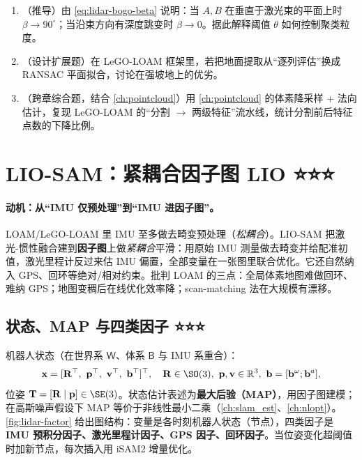 \begin{practice}
\begin{enumerate}
  \item （推导）由 \cref{eq:lidar-bogo-beta} 说明：当 $A,B$ 在垂直于激光束的平面上时 $\beta\to 90^\circ$；当沿束方向有深度跳变时 $\beta\to 0$。据此解释阈值 $\theta$ 如何控制聚类粒度。
  \item （设计扩展题）在 LeGO-LOAM 框架里，若把地面提取从“逐列评估”换成 RANSAC 平面拟合，讨论在强坡地上的优劣。
  \item （跨章综合题，结合 \cref{ch:pointcloud}）用 \cref{ch:pointcloud} 的体素降采样 + 法向估计，复现 LeGO-LOAM 的“分割 $\to$ 两级特征”流水线，统计分割前后特征点数的下降比例。
\end{enumerate}
\end{practice}

\section{LIO-SAM：紧耦合因子图 LIO ⭐⭐⭐}
\label{sec:lidar-liosam}

\paragraph{动机：从“IMU 仅预处理”到“IMU 进因子图”。}
LOAM/LeGO-LOAM 里 IMU 至多做去畸变预处理（\emph{松耦合}）。LIO-SAM\cite{shan2020liosam} 把激光-惯性融合建到\textbf{因子图}上做\emph{紧耦合}平滑：用原始 IMU 测量做去畸变并给配准初值，激光里程计反过来估 IMU 偏置，全部变量在一张图里联合优化。它还自然纳入 GPS、回环等绝对/相对约束。批判 LOAM 的三点：全局体素地图难做回环、难纳 GPS；地图变稠后在线优化效率降；scan-matching 法在大规模有漂移。

\subsection{状态、MAP 与四类因子 ⭐⭐⭐}
\label{sec:lidar-liosam-factors}

机器人状态（在世界系 $\mathsf{W}$、体系 $\mathsf{B}$ 与 IMU 系重合）\cite{shan2020liosam}：
\begin{equation}
  \mathbf{x}=[\mathbf{R}^\top,\ \mathbf{p}^\top,\ \mathbf{v}^\top,\ \mathbf{b}^\top]^\top,\quad \mathbf{R}\in\SO(3),\ \mathbf{p},\mathbf{v}\in\mathbb{R}^3,\ \mathbf{b}=[\mathbf{b}^\omega;\mathbf{b}^a],
  \label{eq:lidar-liosam-state}
\end{equation}
位姿 $\mathbf{T}=[\mathbf{R}\mid\mathbf{p}]\in\SE(3)$。状态估计表述为\textbf{最大后验（MAP）}，用因子图建模；在高斯噪声假设下 MAP 等价于非线性最小二乘（\cref{ch:slam_est}、\cref{ch:nlopt}）。\cref{fig:lidar-factor} 给出图结构：变量是各时刻机器人状态（节点），四类因子是\textbf{IMU 预积分因子、激光里程计因子、GPS 因子、回环因子}。当位姿变化超阈值时加新节点，每次插入用 iSAM2\cite{kaess2012isam2} 增量优化。

